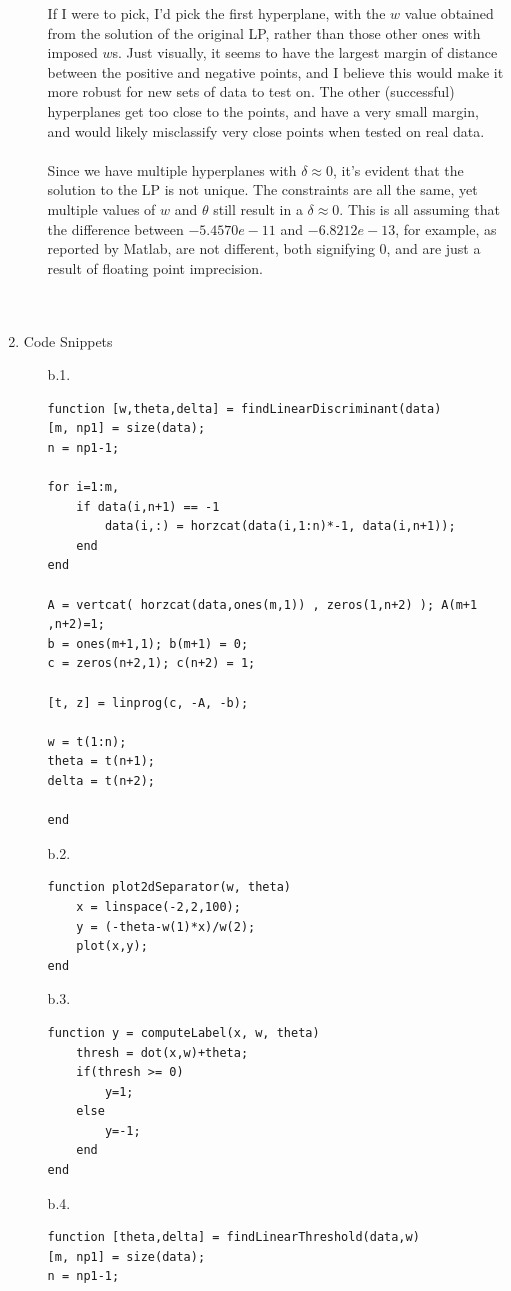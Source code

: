 \begin{enumerate}
\begin{enumerate}
                 If I were to pick, I'd pick the first hyperplane, with the $w$ value obtained from the solution of the original LP, rather than those other ones with imposed $w$s. Just visually, it seems to have the largest margin of distance between the positive and negative points, and I believe this would make it more robust for new sets of data to test on. The other (successful) hyperplanes get too close to the points, and have a very small margin, and would likely misclassify very close points when tested on real data.\\\\
                 Since we have multiple hyperplanes with $\delta \approx 0$, it's evident that the solution to the LP is not unique. The constraints are all the same, yet multiple values of $w$ and $\theta$ still result in a $\delta \approx 0$. This is all assuming that the difference between $-5.4570e-11$ and $-6.8212e-13$, for example, as reported by Matlab, are not different, both signifying $0$, and are just a result of floating point imprecision.\\\\\\
                
      \end{enumerate}
\item Code Snippets
      \begin{enumerate}
      \item [b.1.]
      \begin{verbatim}
function [w,theta,delta] = findLinearDiscriminant(data)
[m, np1] = size(data);
n = np1-1;

for i=1:m,
    if data(i,n+1) == -1
        data(i,:) = horzcat(data(i,1:n)*-1, data(i,n+1));
    end
end

A = vertcat( horzcat(data,ones(m,1)) , zeros(1,n+2) ); A(m+1 ,n+2)=1;
b = ones(m+1,1); b(m+1) = 0;
c = zeros(n+2,1); c(n+2) = 1;

[t, z] = linprog(c, -A, -b);

w = t(1:n);
theta = t(n+1);
delta = t(n+2);

end
      \end{verbatim}
      \item [b.2.]
      \begin{verbatim}
function plot2dSeparator(w, theta)
    x = linspace(-2,2,100);
    y = (-theta-w(1)*x)/w(2);
    plot(x,y);
end
      \end{verbatim}  
      \item [b.3.]
      \begin{verbatim}
function y = computeLabel(x, w, theta)
    thresh = dot(x,w)+theta;
    if(thresh >= 0)
        y=1;
    else
        y=-1;
    end
end
      \end{verbatim}
      \item [b.4.]
      \begin{verbatim}
function [theta,delta] = findLinearThreshold(data,w)
[m, np1] = size(data);
n = np1-1;


\end{verbatim}
\end{enumerate}
\end{enumerate}
